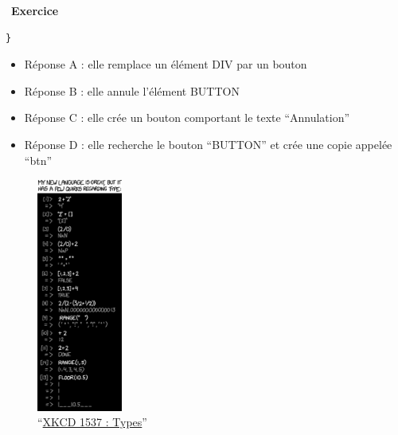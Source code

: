 \documentclass[
  11pt,
]{article}
\providecommand{\tightlist}{%
  \setlength{\itemsep}{0pt}\setlength{\parskip}{0pt}}
\newcounter{exo}
\newenvironment{exercice}[1]
{\par \medskip   \addtocounter{exo}{1} \noindent  
\begin{bclogo}[arrondi =0.1,   noborder = true, logo=\bccrayon, marge=4]{~\textbf{Exercice} \textbf{\theexo} {\itshape #1} }  \par}
{
\end{bclogo}
 \par \bigskip }
\begin{document}
\begin{exercice}{}
\begin{enumerate}
\begin{lstlisting}
}
\end{lstlisting}

  \begin{itemize}
  \tightlist
  \item
    Réponse A : elle remplace un élément DIV par un bouton
  \item
    Réponse B : elle annule l'élément BUTTON
  \item
    Réponse C : elle crée un bouton comportant le texte ``Annulation''
  \item
    Réponse D : elle recherche le bouton ``BUTTON'' et crée une copie
    appelée ``btn''
  \end{itemize}
\end{enumerate}

\end{exercice}

\begin{figure}
\centering
\includegraphics[width=0.25\textwidth,height=\textheight]{images/types.png}
\caption{``\href{https://xkcd.com/1537/}{XKCD 1537 : Types}''}
\end{figure}
\end{document}

